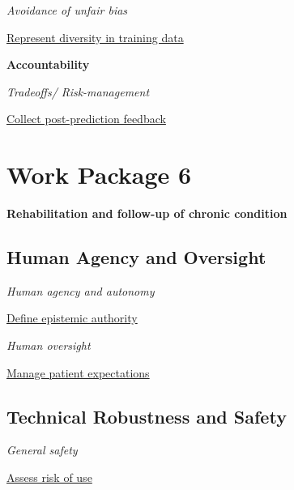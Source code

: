 \documentclass[
  letterpaper,
  DIV=11,
  numbers=noendperiod]{scrreport}
\begin{document}

\emph{Avoidance of unfair bias}

\protect\hyperlink{represent-diversity-in-training-data}{Represent
diversity in training data}

\textbf{Accountability}

\emph{Tradeoffs/ Risk-management}

\protect\hyperlink{collect-post-prediction-feedback}{Collect
post-prediction feedback}


\hypertarget{work-package-6}{%
\chapter*{Work Package 6}\label{work-package-6}}


\textbf{Rehabilitation and follow-up of chronic condition}

\hypertarget{human-agency-and-oversight-5}{%
\section*{Human Agency and
Oversight}\label{human-agency-and-oversight-5}}


\emph{Human agency and autonomy}

\protect\hyperlink{define-epistemic-authority}{Define epistemic
authority}

\emph{Human oversight}

\protect\hyperlink{manage-patient-expectations}{Manage patient
expectations}

\hypertarget{technical-robustness-and-safety-5}{%
\section*{Technical Robustness and
Safety}\label{technical-robustness-and-safety-5}}


\emph{General safety}

\protect\hyperlink{assess-risk-of-use}{Assess risk of use}
\end{document}
